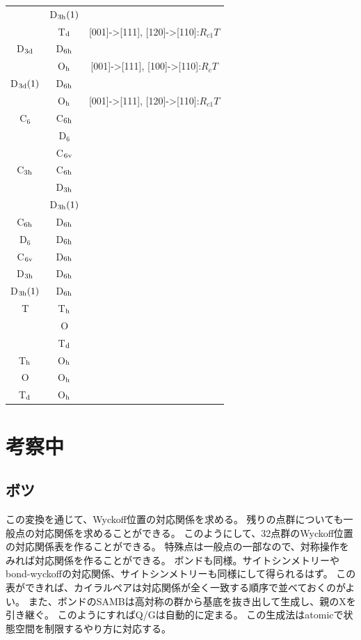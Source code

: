 \documentclass[11pt]{easymemo}
\begin{document}
\begin{table}[t]
\begin{center}
\begin{tabular}{ccc}
      & D$_{\rm 3h}(1)$ & \\
      & T$_{\rm d}$ & [001]->[111], [120]->[110]:$R_{c1}T$ \\ \hline
D$_{\rm 3d}$ & D$_{\rm 6h}$ & \\
    & O$_{\rm h}$ & [001]->[111], [100]->[110]:$R_cT$ \\ \hline
D$_{\rm 3d}(1)$ & D$_{\rm 6h}$ & \\
      & O$_{\rm h}$ & [001]->[111], [120]->[110]:$R_{c1}T$ \\ \hline\hline
C$_6$ & C$_{\rm 6h}$ & \\
   & D$_6$ & \\
   & C$_{\rm 6v}$ & \\ \hline
C$_{\rm 3h}$ & C$_{\rm 6h}$ & \\
    & D$_{\rm 3h}$ & \\
    & D$_{\rm 3h}(1)$ & \\ \hline
C$_{\rm 6h}$ & D$_{\rm 6h}$ & \\ \hline
D$_6$ & D$_{\rm 6h}$ & \\ \hline
C$_{\rm 6v}$ & D$_{\rm 6h}$ & \\ \hline
D$_{\rm 3h}$ & D$_{\rm 6h}$ & \\ \hline
D$_{\rm 3h}(1)$ & D$_{\rm 6h}$ & \\ \hline\hline
T & T$_{\rm h}$ & \\
  & O & \\
  & T$_{\rm d}$ & \\ \hline
T$_{\rm h}$ & O$_{\rm h}$ & \\ \hline
O & O$_{\rm h}$ & \\ \hline
T$_{\rm d}$ & O$_{\rm h}$ & \\ \hline\hline
\end{tabular}
\end{center}
\end{table}

\section{考察中}




\subsection{ボツ}

この変換を通じて、Wyckoff位置の対応関係を求める。
残りの点群についても一般点の対応関係を求めることができる。
このようにして、32点群のWyckoff位置の対応関係表を作ることができる。
特殊点は一般点の一部なので、対称操作をみれば対応関係を作ることができる。
ボンドも同様。サイトシンメトリーやbond-wyckoffの対応関係、サイトシンメトリーも同様にして得られるはず。
この表ができれば、カイラルペアは対応関係が全く一致する順序で並べておくのがよい。
また、ボンドのSAMBは高対称の群から基底を抜き出して生成し、親のXを引き継ぐ。
このようにすればQ/Gは自動的に定まる。
この生成法はatomicで状態空間を制限するやり方に対応する。
\end{document}
